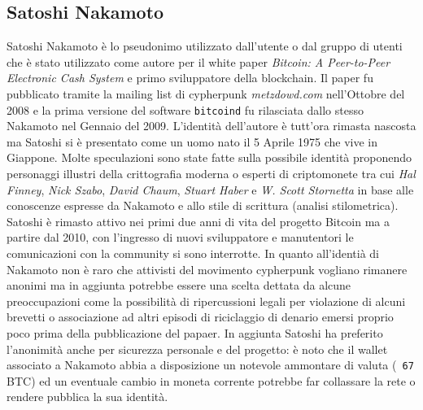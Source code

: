 \appendix
\begin{appendices}
    \chapter{Satoshi Nakamoto}\label{app:satoshi}
    Satoshi Nakamoto è lo pseudonimo utilizzato dall'utente o dal gruppo di utenti che è stato utilizzato come autore per il white paper \textit{Bitcoin: A Peer-to-Peer Electronic Cash System} e primo sviluppatore della blockchain.\newline
    Il paper fu pubblicato tramite la mailing list di cypherpunk \textit{metzdowd.com} nell'Ottobre del 2008 e la prima versione del software \texttt{bitcoind} fu rilasciata dallo stesso Nakamoto nel Gennaio del 2009.\newline
    L'identità dell'autore è tutt'ora rimasta nascosta ma Satoshi si è presentato come un uomo nato il 5 Aprile 1975 che vive in Giappone. Molte speculazioni sono state fatte sulla possibile identità proponendo personaggi illustri della crittografia moderna o esperti di criptomonete tra cui \textit{Hal Finney}, \textit{Nick Szabo}, \textit{David Chaum}, \textit{Stuart Haber} e \textit{W. Scott Stornetta} in base alle conoscenze espresse da Nakamoto e allo stile di scrittura (analisi stilometrica).\newline
    Satoshi è rimasto attivo nei primi due anni di vita del progetto Bitcoin ma a partire dal 2010, con l'ingresso di nuovi sviluppatore e manutentori le comunicazioni con la community si sono interrotte.\newline
    In quanto all'identià di Nakamoto non è raro che attivisti del movimento cypherpunk vogliano rimanere anonimi ma in aggiunta potrebbe essere una scelta dettata da alcune preoccupazioni come la possibilità di ripercussioni legali per violazione di alcuni brevetti o associazione ad altri episodi di riciclaggio di denario emersi proprio poco prima della pubblicazione del papaer.\newline
    In aggiunta Satoshi ha preferito l'anonimità anche per sicurezza personale e del progetto: è noto che il wallet associato a Nakamoto abbia a disposizione un notevole ammontare di valuta (\texttt{~67} BTC) ed un eventuale cambio in moneta corrente potrebbe far collassare la rete o rendere pubblica la sua identità.
\end{appendices}

